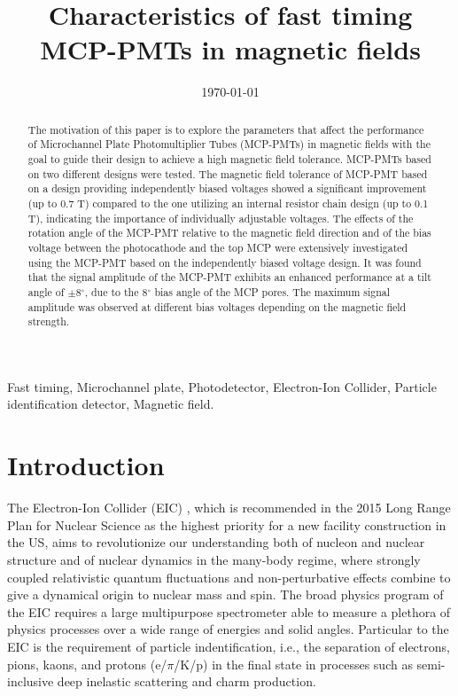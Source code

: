 \documentclass[preprint,5p]{elsarticle}
\title{\vspace{-15mm}\fontsize{18pt}{10pt}\selectfont\textbf{Characteristics of 
fast timing MCP-PMTs in magnetic fields}}
\date{\today}
\begin{document}
\begin{abstract}

 The motivation of this paper is to explore the 
   parameters that affect the performance of Microchannel Plate Photomultiplier Tubes (MCP-PMTs) in magnetic 
   fields  with the goal to guide their design to achieve a high magnetic field tolerance. 
MCP-PMTs based on two different designs were tested.
 The magnetic field tolerance 
   of MCP-PMT based on a design providing independently biased voltages showed a significant 
   improvement (up to 0.7 T) compared to the one utilizing an internal resistor 
   chain design (up to 0.1 T), indicating the importance of individually adjustable voltages.
The effects of the rotation angle of the MCP-PMT
   relative to the magnetic field direction and of the bias voltage between the 
   photocathode and the top MCP were extensively investigated using the MCP-PMT based on the independently 
   biased voltage design.
It was found that the signal amplitude of the MCP-PMT exhibits an enhanced 
   performance at a tilt angle of $\pm$8$^{\circ}$, due to the 8$^{\circ}$ bias angle of the MCP 
   pores.
The maximum signal amplitude was observed at different bias voltages depending on the magnetic field strength.
\end{abstract}

\maketitle

\begin{keywords}
   Fast timing, Microchannel plate, Photodetector, Electron-Ion Collider, 
   Particle identification detector, Magnetic field.
\end{keywords}

\section{Introduction} \label{sec:level1}
The Electron-Ion Collider (EIC) \cite{1}, which is recommended in the 2015 Long 
Range Plan for Nuclear Science \cite{2} as the highest priority for a new 
facility construction in the US, aims to revolutionize our understanding both 
of nucleon and nuclear structure and of nuclear dynamics in the many-body 
regime, where strongly coupled relativistic quantum fluctuations and 
non-perturbative effects combine to give a dynamical origin to nuclear mass and 
spin. The broad physics program of the EIC requires a large multipurpose 
spectrometer able to measure a plethora of physics processes over a wide range
of energies and solid angles. 
Particular to the EIC is the requirement of particle indentification, 
i.e., the separation of electrons, pions, kaons, and protons (e/$\pi$/K/p) in the final 
state in processes such as semi-inclusive deep inelastic scattering and charm production.
\end{document}
